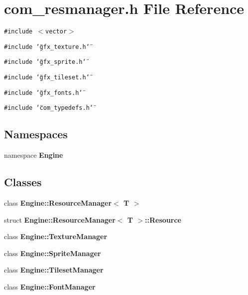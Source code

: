 \section{com\_\-resmanager.h File Reference}
\label{com__resmanager_8h}
{\tt \#include $<$vector$>$}\par
{\tt \#include \char`\"{}gfx\_\-texture.h\char`\"{}}\par
{\tt \#include \char`\"{}gfx\_\-sprite.h\char`\"{}}\par
{\tt \#include \char`\"{}gfx\_\-tileset.h\char`\"{}}\par
{\tt \#include \char`\"{}gfx\_\-fonts.h\char`\"{}}\par
{\tt \#include \char`\"{}com\_\-typedefs.h\char`\"{}}\par
\subsection*{Namespaces}
\begin{CompactItemize}
\item 
namespace {\bf Engine}
\end{CompactItemize}
\subsection*{Classes}
\begin{CompactItemize}
\item 
class {\bf Engine::ResourceManager$<$ T $>$}
\item 
struct {\bf Engine::ResourceManager$<$ T $>$::Resource}
\item 
class {\bf Engine::TextureManager}
\item 
class {\bf Engine::SpriteManager}
\item 
class {\bf Engine::TilesetManager}
\item 
class {\bf Engine::FontManager}
\end{CompactItemize}
